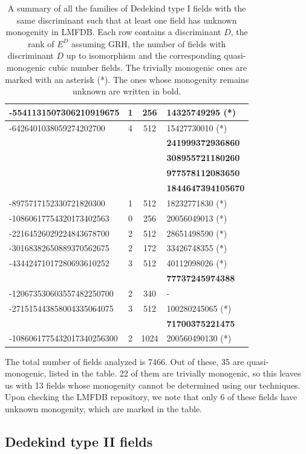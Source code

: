 \documentclass[oneside]{amsart}
\theoremstyle{definition}
\begin{document}
\begin{table}[H]
\begin{tabular}{|l|c|c|l|}
\hline
-5541131507306210919675 & 1 & 256 & 14325749295 (*)\\
\hline
-6426401038059274202700 & 4 & 512 & 15427730010 (*)\\
&&& \textbf{241999372936860} \\
&&& \textbf{308955721180260} \\
&&& \textbf{977578112083650} \\
&&& \textbf{1844647394105670} \\
\hline
-8975717152330721820300 & 1 & 512 & 18232771830 (*)\\
\hline
-10860617754320173402563 & 0 & 256 & 20056049013 (*)\\
\hline
-22164526029224843678700 & 2 & 512 & 28651498590 (*)\\
\hline
-30168382650889370562675 & 2 & 172 & 33426748355 (*)\\
\hline
-43442471017280693610252 & 3 & 512 & 40112098026 (*)\\
&&& \textbf{77737245974388} \\
\hline
-120673530603557482250700 & 2 & 340 &-\\
\hline
-271515443858004335064075 & 3 & 512 & 100280245065 (*)\\
&&& \textbf{71700375221475} \\
\hline
-1086061775432017340256300 & 2 & 1024 & 200560490130 (*)\\
\hline
\end{tabular}
\caption{A summary of all the families of Dedekind type I fields with the same discriminant such that at least one field has unknown monogenity in LMFDB. Each row contains a discriminant $D$, the rank of $E^D$ assuming GRH, the number of fields with discriminant $D$ up to isomorphism and the corresponding quasi-monogenic cubic number fields. The trivially monogenic ones are marked with an asterisk (*). The ones whose monogenity remains unknown are written in bold.}
\label{table: Dedekind type I}
\end{table}

The total number of fields analyzed is 7466. Out of these, 35 are quasi-monogenic, listed in the table. 22 of them are trivially monogenic, so this leaves us with 13 fields whose monogenity cannot be determined using our techniques. Upon checking the LMFDB repository, we note that only 6 of these fields have unknown monogenity, which are marked in the table. 

\subsection{Dedekind type II fields}
\end{document}
